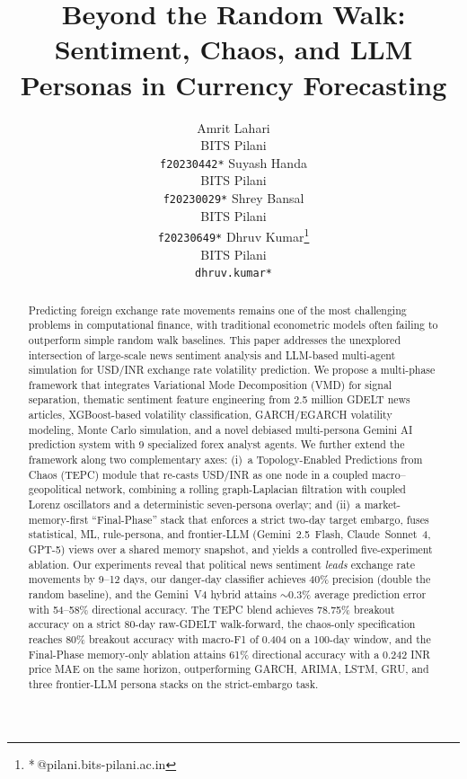 \documentclass[11pt]{article}
\title{Beyond the Random Walk: Sentiment, Chaos, and LLM Personas in Currency Forecasting}
\author{
Amrit Lahari \\
BITS Pilani \\
\texttt{f20230442*}
\And
Suyash Handa \\
BITS Pilani \\
\texttt{f20230029*}
\And
Shrey Bansal \\
BITS Pilani \\
\texttt{f20230649*}
\And
Dhruv Kumar\thanks{*\,@pilani.bits-pilani.ac.in} \\
BITS Pilani \\
\texttt{dhruv.kumar*}
}
\begin{document}
\maketitle

\begin{abstract}
Predicting foreign exchange rate movements remains one of the most challenging problems in computational finance, with traditional econometric models often failing to outperform simple random walk baselines. This paper addresses the unexplored intersection of large-scale news sentiment analysis and LLM-based multi-agent simulation for USD/INR exchange rate volatility prediction. We propose a multi-phase framework that integrates Variational Mode Decomposition (VMD) for signal separation, thematic sentiment feature engineering from 2.5 million GDELT news articles, XGBoost-based volatility classification, GARCH/EGARCH volatility modeling, Monte Carlo simulation, and a novel debiased multi-persona Gemini AI prediction system with 9 specialized forex analyst agents. We further extend the framework along two complementary axes: (i)~a Topology-Enabled Predictions from Chaos (TEPC) module that re-casts USD/INR as one node in a coupled macro--geopolitical network, combining a rolling graph-Laplacian filtration with coupled Lorenz oscillators and a deterministic seven-persona overlay; and (ii)~a market-memory-first ``Final-Phase'' stack that enforces a strict two-day target embargo, fuses statistical, ML, rule-persona, and frontier-LLM (Gemini~2.5~Flash, Claude~Sonnet~4, GPT-5) views over a shared memory snapshot, and yields a controlled five-experiment ablation. Our experiments reveal that political news sentiment \textit{leads} exchange rate movements by 9--12 days, our danger-day classifier achieves 40\% precision (double the random baseline), and the Gemini~V4 hybrid attains $\sim$0.3\% average prediction error with 54--58\% directional accuracy. The TEPC blend achieves 78.75\% breakout accuracy on a strict 80-day raw-GDELT walk-forward, the chaos-only specification reaches 80\% breakout accuracy with macro-F1 of 0.404 on a 100-day window, and the Final-Phase memory-only ablation attains 61\% directional accuracy with a 0.242 INR price MAE on the same horizon, outperforming GARCH, ARIMA, LSTM, GRU, and three frontier-LLM persona stacks on the strict-embargo task.
\end{abstract}
\end{document}

